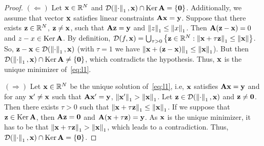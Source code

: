 \begin{proof}
    $(\Leftarrow)$ Let $\x \in \mathbb{R}^N$ and $\mathcal{D}(\norm{\cdot}_1, \x) \cap \op{Ker} \A = \{\mathbf{0}\}$.
    Additionally, we assume that vector $\x$ satisfies linear constraints $\A\x=\y$.
    Suppose that there exists $\z \in \mathbb{R}^N$, $\z \neq \x$, such that $\A\z=\y$ and $\norm{z}_1 \leq \norm{x}_1$.
    Then $\A(\z-\x)=0$ and $z-x \in \op{Ker} \A$.
    By definition, $\mathcal{D}(f, \x) = \bigcup_{\tau > 0} \left\{ \z \in \mathbb{R}^N: \norm{\x+\tau \z}_1 \leq \norm{\x} \right\}$.
    So, $\z - \x \in \mathcal{D}(\norm{\cdot}_1, \x)$ (with $\tau = 1$ we have $\norm{\x + (\z - \x)}_1 \leq \norm{\x}_1$).
    But then $\mathcal{D}(\norm{\cdot}_1, \x) \cap \op{Ker} \A \neq \{\mathbf{0}\}$, which contradicts the hypothesis.
    Thus, $\x$ is the unique minimizer of~\ref{eq:l1}.

    $(\Rightarrow)$ Let $\x \in \mathbb{R}^N$ be the unique solution of~\ref{eq:l1}, i.e, $\x$ satisfies $\A\x=\y$ and
    for any $\x' \neq \x$ such that $\A \x' = \y$, $\norm{\x'}_1 > \norm{\x}_1$.
    Let $\z \in \mathcal{D}(\norm{\cdot}_1, \x)$ and $\z \neq \mathbf{0}$.
    Then there exists $\tau > 0$ such that $\norm{\x + \tau \z}_1 \leq \norm{\x}_1 $.
    If we suppose that $\z \in \op{Ker} \A$, then $\A \z = \mathbf{0}$ and $\A(\x + \tau \z) = \y$.
    As $\x$ is the unique minimizer, it has to be that $\norm{\x + \tau \z}_1 > \norm{\x}_1$, which leads to a contradiction.
    Thus, $\mathcal{D}(\norm{\cdot}_1, \x) \cap \op{Ker} \A = \{\mathbf{0}\}$.
\end{proof}

